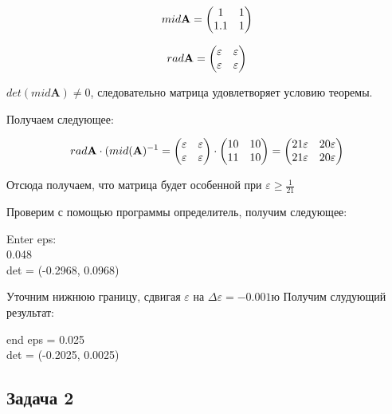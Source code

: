 \documentclass[12pt,a4paper]{scrartcl}
\begin{document}
\begin{equation*}
\centering
mid \textbf{A} = 
\begin{pmatrix}
1 & 1\\
1.1 & 1
\end{pmatrix}
\end{equation*}

\begin{equation*}
\centering
rad \textbf{A} = \begin{pmatrix}
\varepsilon & \varepsilon\\
\varepsilon & \varepsilon
\end{pmatrix}
\end{equation*}

$det (mid \textbf{A}) \neq 0 $, следовательно матрица удовлетворяет условию теоремы.

Получаем следующее:
	
\begin{equation*}
\centering
rad  \textbf{A} \cdot (mid( \textbf{A})^{-1} =
 \begin{pmatrix}
\varepsilon & \varepsilon\\
\varepsilon & \varepsilon
\end{pmatrix}
 \cdot
 \begin{pmatrix}
10 & 10\\
11 & 10
\end{pmatrix}
 = 
 \begin{pmatrix}
21 \varepsilon & 20 \varepsilon\\
21 \varepsilon & 20 \varepsilon
\end{pmatrix}
\end{equation*}

Отсюда получаем, что матрица будет особенной при $\varepsilon \geq \frac{1}{21}$
\newline

Проверим с помощью программы определитель, получим следующее:
\begin{flushleft}
  Enter  eps:\\0.048\\det = (-0.2968, 0.0968)
\end{flushleft}
Уточним нижнюю границу, сдвигая $\varepsilon$ на $\Delta \varepsilon = -0.001$ю
Получим слудующий результат:
\begin{flushleft}
end eps = 0.025\\det = (-0.2025, 0.0025)
\end{flushleft}

\subsection{Задача 2}
\end{document}
